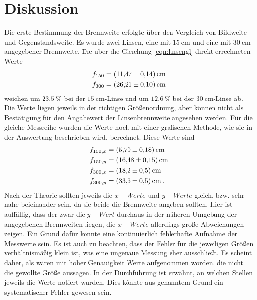 \section{Diskussion}
\label{sec:Diskussion}

Die erste Bestimmung der Brennweite erfolgte über den Vergleich von Bildweite und Gegenstandsweite. Es wurde zwei Linsen, eine mit 
$\SI{15}{\cm} $ und eine mit $\SI{30}{\cm} $ angegebener Brennweite. Die über die Gleichung \ref{eqn:linsengl} direkt errechneten 
Werte 
\begin{align}
    f_{150} &= \SI{11.47+-0.14}{\centi\metre} \\
    f_{300} &= \SI{26.21+-0.10}{\centi\metre} 
\end{align}
weichen um $\SI{23.5}{\percent} $ bei der $\SI{15}{\cm}$-Linse und um $\SI{12.6}{\percent} $ bei der $\SI{30}{\cm}$-Linse ab.
Die Werte liegen jeweils in der richtigen Größenordnung, aber können nicht als Bestätigung für den Angabewert der Linsenbrennweite 
angesehen werden. Für die gleiche Messreihe wurden die Werte noch mit einer grafischen Methode, wie sie in der Auswertung beschrieben
wird, berechnet. Diese Werte sind 
\begin{align*}
    f_{150,x} &= \SI{5.70+-0.18}{\centi\metre} \\
    f_{150,y} &= \SI{16.48+-0.15}{\centi\metre} \\
    f_{300,x} &= \SI{18.2+-0.5}{\centi\metre} \\
    f_{300,y} &= \SI{33.6+-0.5}{\centi\metre} \, .
\end{align*}
Nach der Theorie sollten jeweils die $x-Werte$ und $y-Werte$ gleich, bzw. sehr nahe beieinander sein, da sie beide die Brennweite
angeben sollten. Hier ist auffällig, dass der zwar die $y-Wert$ durchaus in der näheren Umgebung der angegebenen Brennweiten
liegen, die $x-Werte$ allerdings große Abweichungen zeigen. Ein Grund dafür könnte eine kontinuierlich fehlerhafte Aufnahme der 
Messwerte sein. Es ist auch zu beachten, dass der Fehler für die jeweiligen Größen verhältnismäßig klein ist, was eine ungenaue 
Messung eher ausschließt. Es scheint daher, als wären mit hoher Genauigkeit Werte aufgenommen worden, die nicht die gewollte 
Größe aussagen. In der Durchführung ist erwähnt, an welchen Stellen jeweils die Werte notiert wurden. Dies könnte aus genanntem 
Grund ein systematischer Fehler gewesen sein. 

